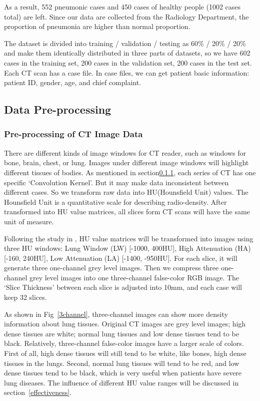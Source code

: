 \documentclass[journal]{IEEEtran}
\begin{document}
As a result, 552 pneumonic cases and 450 cases of healthy people (1002 cases total) are left. Since our data are collected from the Radiology Department, the proportion of pneumonia are higher than normal proportion.

The dataset is divided into training / validation / testing as 60\% / 20\% / 20\% and make them identically distributed in three parts of datasets, so we have 602 cases in the training set, 200 cases in the validation set, 200 cases in the test set.
Each CT scan has a case file. In case files, we can get patient basic information: patient ID, gender, age, and chief complaint. 

\subsection{Data Pre-processing}
\subsubsection{Pre-processing of CT Image Data}
\label{ctimagedata}
There are different kinds of image windows for CT reader, such as windows for bone, brain, chest, or lung. Images under different image windows will highlight different tissues of bodies.
As mentioned in section\ref{ctimagedata}, each series of CT has one specific `Convolution Kernel'. But it may make data inconsistent between different cases. So we transform raw data into HU(Hounsfield Unit) values. The Hounsfield Unit is a quantitative scale for describing radio-density. After transformed into HU value matrices, all slices form CT scans will have the same unit of measure.

Following the study in \cite{Shin2017Three, gao2018holistic}, HU value matrices will be transformed into images using three HU windows: Lung Window (LW) [-1000, 400HU], High Attenuation (HA) [-160, 240HU], Low Attenuation (LA) [-1400, -950HU]. 
For each slice, it will generate three one-channel grey level images. Then we compress three one-channel grey level images into one three-channel false-color RGB image. The `Slice Thickness' between each slice is adjusted into 10mm, and each case will keep 32 slices.

As shown in Fig~\ref{3channel}, three-channel images can show more density information about lung tissues. Original CT images are grey level images; high dense tissues are white; normal lung tissues and low dense tissues tend to be black. 
Relatively, three-channel false-color images have a larger scale of colors. First of all, high dense tissues will still tend to be white, like bones, high dense tissues in the lungs. Second, normal lung tissues will tend to be red, and low dense tissues tend to be black, which is very useful when patients have severe lung diseases.
The influence of different HU value ranges will be discussed in section~\ref{effectiveness}.
    
\end{document}
